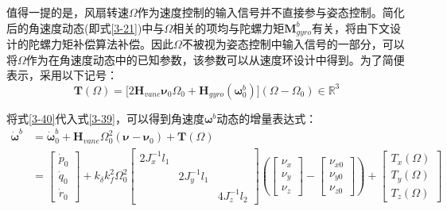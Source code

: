 值得一提的是，风扇转速$\Omega$作为速度控制的输入信号并不直接参与姿态控制。简化后的角速度动态(即式\eqref{3-21})中与$\Omega$相关的项均与陀螺力矩$\boldsymbol{M}_{gyro}^b$有关，将由下文设计的陀螺力矩补偿算法补偿。因此$\Omega$不被视为姿态控制中输入信号的一部分，可以将$\Omega$作为在角速度动态中的已知参数，该参数可以从速度环设计中得到。为了简便表示，采用以下记号：
\begin{equation}
    \boldsymbol{T}(\Omega)=\big[2\boldsymbol{H}_{vane}\boldsymbol{\nu}_0\Omega_0+\boldsymbol{H}_{gyro}(\boldsymbol{\omega}_0^b)\big](\Omega-\Omega_0)\in\mathbb{R}^3
    \label{3-40}
\end{equation}

将式\eqref{3-40}代入式\eqref{3-39}，可以得到角速度$\boldsymbol{\omega}^b$动态的增量表达式：
\begin{equation}
    \begin{aligned}
    \boldsymbol{\dot{\omega}}^b&=\boldsymbol{\dot{\omega}}_0^b+\boldsymbol{H}_{vane}\Omega_0^2(\boldsymbol{\nu}-\boldsymbol{\nu}_0)+\boldsymbol{T}(\Omega)\\
    &=\begin{bmatrix}\dot{p}_0 \\ \dot{q}_0 \\ \dot{r}_0 \end{bmatrix}
    + k_{\delta}k_f^2\Omega_0^2
    \left[\begin{array}{ccc}2J_x^{-1}l_1 & & \\& 2J_y^{-1}l_1 & \\& & 4J_z^{-1}l_2\end{array}\right]
    \left(\begin{bmatrix}\nu_{x} \\ \nu_{y} \\ \nu_{z}\end{bmatrix}
    -\begin{bmatrix}\nu_{x0} \\ \nu_{y0} \\ \nu_{z0}\end{bmatrix}\right)
    +  \begin{bmatrix}T_{x}(\Omega) \\ T_{y}(\Omega) \\ T_{z}(\Omega)
    \end{bmatrix}
    \end{aligned}
    \label{3-41}
\end{equation}

